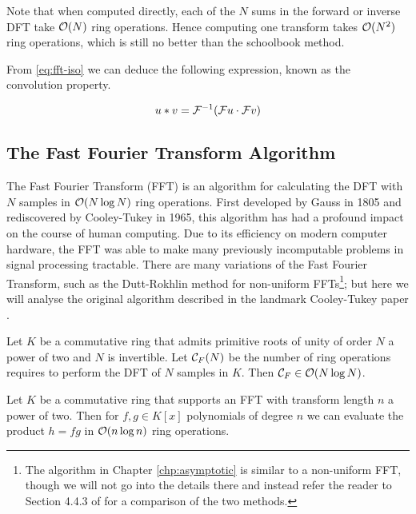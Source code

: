Note that when computed directly, each of the $N$ sums in the forward or inverse DFT take $\mathcal O(N)$ ring operations. Hence computing one transform takes $\mathcal O(N^2)$ ring operations, which is still no better than the schoolbook method.

From \eqref{eq:fft-iso} we can deduce the following expression, known as the convolution property.

\begin{equation}
    u \ast v = \mathcal F^{-1}(\mathcal Fu \cdot \mathcal Fv)
\end{equation}


\subsection{The Fast Fourier Transform Algorithm}

The Fast Fourier Transform (FFT) is an algorithm for calculating the DFT with $N$ samples in $\mathcal O(N \log N)$ ring operations. First developed by Gauss in 1805 \cite{gauss} and rediscovered by Cooley-Tukey in 1965, this algorithm has had a profound impact on the course of human computing. Due to its efficiency on modern computer hardware, the FFT was able to make many previously incomputable problems in signal processing tractable.
There are many variations of the Fast Fourier Transform, such as the Dutt-Rokhlin method for non-uniform FFTs\cite{dutt}\footnote{The algorithm in Chapter \ref{chp:asymptotic} is similar to a non-uniform FFT, though we will not go into the details there and instead refer the reader to Section 4.4.3 of \cite{nlogn} for a comparison of the two methods.}; but here we will analyse the original algorithm described in the landmark Cooley-Tukey paper \cite{fft}.

\begin{theorem}\label{thm:fft}
    Let $K$ be a commutative ring that admits primitive roots of unity of order $N$ a power of two and $N$ is invertible. Let $\mathcal C_F(N)$ be the number of ring operations requires to perform the DFT of $N$ samples in $K$. Then $\mathcal C_F \in \mathcal O(N\log N)$.
\end{theorem}

\begin{corollary}
    Let $K$ be a commutative ring that supports an FFT with transform length $n$ a power of two. Then for $f, g \in K[x]$ polynomials of degree $n$ we can evaluate the product $h = fg$ in $\mathcal O(n\log n)$ ring operations.
\end{corollary}

